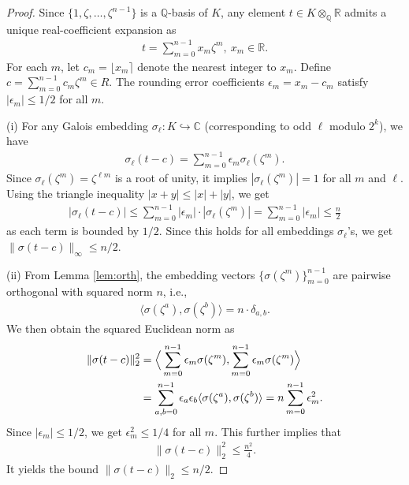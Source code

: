 \documentclass[11pt,a4paper]{article}
\theoremstyle{plain}
\theoremstyle{definition}
\theoremstyle{remark}
\newcommand{\Q}{\mathbb{Q}}
\newcommand{\R}{\mathbb{R}}
\newcommand{\C}{\mathbb{C}}
\begin{document}
\begin{proof}
Since $\{1, \zeta, \dots, \zeta^{n-1}\}$ is a $\Q$-basis of $K$, any element $t \in K\otimes_\Q\R$ admits a unique real-coefficient expansion as
\begin{align}
t=\sum_{m=0}^{n-1} x_m \zeta^m, \ x_m \in \R.
\label{E:exp}
\end{align}
For each $m$, let $c_m=\lfloor x_m \rceil$ denote the nearest integer to $x_m$. Define $c=\sum_{m=0}^{n-1} c_m \zeta^m \in R$. The rounding error coefficients $\epsilon_m=x_m-c_m$ satisfy $|\epsilon_m| \le 1/2$ for all $m$.

(i) For any Galois embedding $\sigma_\ell: K \hookrightarrow \C$ (corresponding to odd $\ell$ modulo $2^k$), we have
\begin{align}
\sigma_\ell(t-c)=\sum_{m=0}^{n-1} \epsilon_m \sigma_\ell(\zeta^m).
\label{E:emb}
\end{align}
Since $\sigma_\ell(\zeta^m)=\zeta^{\ell m}$ is a root of unity, it implies $|\sigma_\ell(\zeta^m)|=1$ for all $m$ and $\ell$. Using the triangle inequality $|x+y|\leq |x|+|y|$, we get 
\begin{align}
|\sigma_\ell(t-c)| \le \sum_{m=0}^{n-1} |\epsilon_m| \cdot |\sigma_\ell(\zeta^m)|=\sum_{m=0}^{n-1} |\epsilon_m|\le \frac{n}{2}
\label{E:sigtri}
\end{align}
as each term is bounded by $1/2$. Since this holds for all embeddings $\sigma_\ell$'s, we get $\|\sigma(t-c)\|_\infty \le n/2$.

(ii) From Lemma \ref{lem:orth}, the embedding vectors $\{\sigma(\zeta^m)\}_{m=0}^{n-1}$ are pairwise orthogonal with squared norm $n$, i.e., 
\begin{align}
\langle \sigma(\zeta^a), \sigma(\zeta^b) \rangle=n\cdot \delta_{a,b}.
\label{E:typair}
\end{align}
We then obtain the squared Euclidean norm as
\begin{align}
\|\sigma(t-c)\|_2^2&=\Big\langle \sum_{m=0}^{n-1} \epsilon_m \sigma(\zeta^m), \sum_{m=0}^{n-1} \epsilon_m \sigma(\zeta^m) \Big\rangle
\notag
  \\
&=\sum_{a,b=0}^{n-1} \epsilon_a \epsilon_b \langle \sigma(\zeta^a), \sigma(\zeta^b) \rangle=n \sum_{m=0}^{n-1} \epsilon_m^2.
\end{align}
Since $|\epsilon_m| \le 1/2$, we get $\epsilon_m^2 \le 1/4$ for all $m$. This further implies that
\begin{align}
\|\sigma(t-c)\|_2^2 \le \frac{n^2}{4}.
\label{E:signorm2}
\end{align}
It yields the bound $\|\sigma(t-c)\|_2 \le n/2$.
\end{proof}
\end{document}
